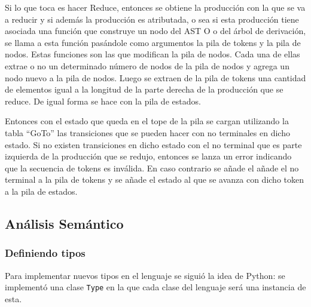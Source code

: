 Si lo que toca es hacer Reduce, entonces se obtiene la producci\'on con la que se va a reducir y si adem\'as la producci\'on es atributada, o sea si esta producci\'on tiene asociada una funci\'on que construye un nodo del AST O o del \'arbol de derivaci\'on, se llama a esta funci\'on pas\'andole como argumentos la pila de tokens y la pila de nodos. Estas funciones son las que modifican la pila de nodos. Cada una de ellas extrae o no un determinado n\'umero de nodos de la pila de nodos y agrega un nodo nuevo a la pila de nodos. Luego se extraen de la pila de tokens una cantidad de elementos igual a la longitud de la parte derecha de la producci\'on que se reduce. De igual forma se hace con la pila de estados. 

Entonces con el estado que queda en el tope de la pila se cargan utilizando la tabla ``GoTo'' las transiciones que se pueden hacer con no terminales en dicho estado. Si no existen transiciones en dicho estado con el no terminal que es parte izquierda de la producci\'on que se redujo, entonces se lanza un error indicando que la secuencia de tokens es inv\'alida. En caso contrario se a\~{n}ade el a\~{n}ade el no terminal a la pila de tokens y se a\~{n}ade el estado al que se avanza con dicho token a la pila de estados.

\subsection{An\'alisis Sem\'antico}
\subsubsection{Definiendo tipos}
Para implementar nuevos tipos en el lenguaje se sigui\'o la idea de Python: se implement\'o una clase \verb|Type| en la que cada clase del lenguaje ser\'a una instancia de esta.
 
